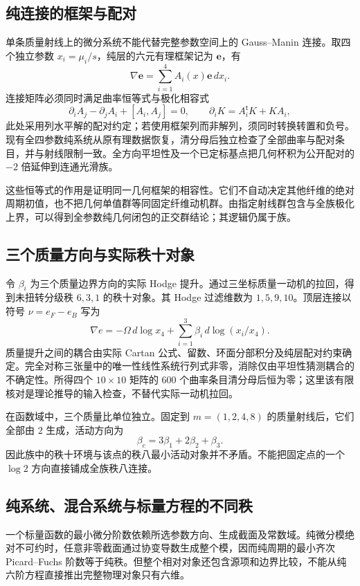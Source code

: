 \documentclass[11pt,a4paper,oneside]{ctexart}
\theoremstyle{cnplain}
\theoremstyle{definition}
\theoremstyle{remark}
\numberwithin{equation}{section}
\begin{document}
\subsection{纯连接的框架与配对}
单条质量射线上的微分系统不能代替完整参数空间上的 Gauss--Manin 连接。取四个独立参数 $x_i=\mu_i/s$，纯层的六元有理框架记为 $\mathbf e$，有
\begin{equation}
 \nabla\mathbf e=\sum_{i=1}^4 A_i(x)\mathbf e\,dx_i.
\end{equation}
连接矩阵必须同时满足曲率恒等式与极化相容式
\begin{equation}
 \partial_iA_j-\partial_jA_i+[A_i,A_j]=0,\qquad
 \partial_iK=A_i^{\mathsf t}K+KA_i,
\end{equation}
此处采用列水平解的配对约定；若使用框架列而非解列，须同时转换转置和负号。现有全四参数纯系统从原有理数据恢复，清分母后独立检查了全部曲率与配对条目，并与射线限制一致。全方向平坦性及一个已定标基点把几何杯积为公开配对的 $-2$ 倍延伸到连通光滑族。

这些恒等式的作用是证明同一几何框架的相容性。它们不自动决定其他纤维的绝对周期初值，也不把几何单值群等同固定纤维动机群。由指定射线群包含与全族极化上界，可以得到全参数纯几何闭包的正交群结论；其逻辑仍属于族。


\subsection{三个质量方向与实际秩十对象}
令 $\beta_i$ 为三个质量边界方向的实际 Hodge 提升。通过三坐标质量一动机的拉回，得到未扭转分级秩 $6,3,1$ 的秩十对象。其 Hodge 过滤维数为 $1,5,9,10$。顶层连接以符号 $\nu=e_F-e_B$ 写为
\begin{equation}
 \nabla e=-\Omega\,d\log x_4+
 \sum_{i=1}^3\beta_i\,d\log(x_i/x_4).
\end{equation}
质量提升之间的耦合由实际 Cartan 公式、留数、环面分部积分及纯层配对约束确定。完全对称三张量中的唯一性线性系统行列式非零，消除仅由平坦性猜测耦合的不确定性。所得四个 $10\times10$ 矩阵的 $600$ 个曲率条目清分母后恒为零；这里该有限核对是理论推导的输入检查，不替代实际一动机拉回。

在函数域中，三个质量比单位独立。固定到 $m=(1,2,4,8)$ 的质量射线后，它们全部由 $2$ 生成，活动方向为
\begin{equation}
 \beta_c=3\beta_1+2\beta_2+\beta_3.
\end{equation}
因此族中的秩十环境与该点的秩八最小活动对象并不矛盾。不能把固定点的一个 $\log2$ 方向直接铺成全族秩八连接。


\subsection{纯系统、混合系统与标量方程的不同秩}
一个标量函数的最小微分阶数依赖所选参数方向、生成截面及常数域。纯微分模绝对不可约时，任意非零截面通过协变导数生成整个模，因而纯周期的最小齐次 Picard--Fuchs 阶数等于纯秩。但整个相对对象还包含源项和边界比较，不能从纯六阶方程直接推出完整物理对象只有六维。
\end{document}
